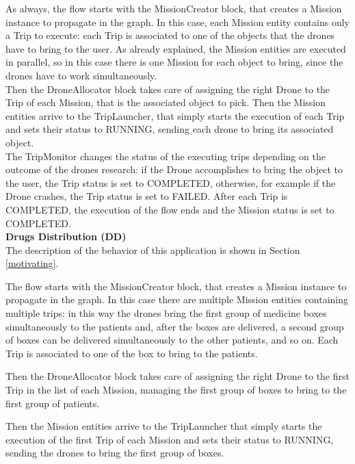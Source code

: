 As always, the flow starts with the MissionCreator block, that creates a Mission instance to propagate in the graph.
In this case, each Mission entity contains only a Trip to execute:
each Trip is associated to one of the objects that the drones have to bring to the user.
As already explained, the Mission entities are executed in parallel, so in this case
there is one Mission for each object to bring, since the drones have to work simultaneously.
\\

Then the DroneAllocator block takes care of assigning the right Drone to the Trip of each Mission, that is the associated object to pick.
Then the Mission entities arrive to the TripLauncher, that simply starts the execution of each Trip and sets their status to RUNNING, sending each drone to bring its associated object.
\\

The TripMonitor changes the status of the executing trips depending on the outcome of the drones research:
if the Drone accomplishes to bring the object to the user, the Trip status is set to COMPLETED, otherwise, for example if the Drone crashes, the Trip status is set to FAILED.
After each Trip is COMPLETED, the execution of the flow ends and the Mission status is set to COMPLETED.
\\


\textbf{Drugs Distribution (DD)}
\\

The description of the behavior of this application is shown in Section \ref{motivating}.

The flow starts with the MissionCreator block, that creates a Mission instance to propagate in the graph.
In this case there are multiple Mission entities containing multiple trips:
in this way the drones bring the first group of medicine boxes simultaneously to the patients and, after the boxes are delivered, a second group of boxes can be delivered simultaneously to the other patients, and so on.
Each Trip is associated to one of the box to bring to the patients.

Then the DroneAllocator block takes care of assigning the right Drone to the first Trip in the list of each Mission, managing the first group of boxes to bring to the first group of patients.

Then the Mission entities arrive to the TripLauncher that simply starts the execution of the first Trip of each Mission and sets their status to RUNNING, sending the drones to bring the first group of boxes.

